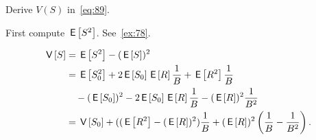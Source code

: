 \begin{exercise}
Derive $V(S)$ in~\cref{eq:89}.
\begin{hint}
 First compute $\E{S^2}$. See~\cref{ex:78}.
\end{hint}
\begin{solution}
 \begin{equation*}
 \begin{split}
\V{S} 
&=\E{S^2} - (\E{S})^2 \\
&= \E{S_0^2} + 2 \E{S_0} \E R\frac 1B + \E{R^2}\frac 1B \\
&\quad - (\E{S_0})^2 - 2\E{S_0}\E R \frac 1 B - (\E R)^2\frac1{B^2}\\
&= \V{S_0} + ((\E{R^2} - (\E R)^2)\frac 1 B + (\E R)^2\left(\frac 1B - \frac 1{B^2}\right).
 \end{split}
 \end{equation*}
\end{solution}
\end{exercise}








